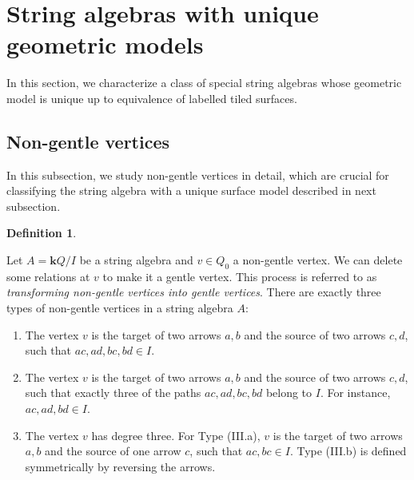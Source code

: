 \documentclass[11pt]{amsart}
\numberwithin{equation}{section}
\theoremstyle{definition}
\newtheorem{definition}[theorem]{Definition}
\begin{document}
\section{String algebras with unique geometric models}\label{section: string algebras with unique geometric models}

In this section, we characterize a class of special string algebras whose geometric model is unique up to equivalence of labelled tiled surfaces. 

\subsection{Non-gentle vertices} In this subsection, we study non-gentle vertices in detail, which are crucial for classifying the string algebra with a unique surface model described in next subsection. 

\begin{definition}\label{def:non-gentle vertices}
	
Let $A = \mathbf{k}Q/I$ be a string algebra and $v \in Q_0$ a non-gentle vertex. We can delete some relations at $v$ to make it a gentle vertex. This process is referred to as \emph{transforming non-gentle vertices into gentle vertices}. There are exactly three types of non-gentle vertices in a string algebra $A$:%
\begin{enumerate}[
    label=\textbf{Type (\Roman*)}, 
    ref=Type \Roman*, 
    leftmargin=2.2cm,        %
    labelwidth=2.0cm,        %
    align=left               %
]
    \item \label{type:I} The vertex $v$ is the target of two arrows $a, b$ and the source of two arrows $c, d$, such that $ac, ad, bc, bd \in I$. 
    
    \item \label{type:II} The vertex $v$ is the target of two arrows $a, b$ and the source of two arrows $c, d$, such that exactly three of the paths $ac, ad, bc, bd$ belong to $I$. For instance, $ac, ad, bd \in I$.
    
    \item \label{type:III} The vertex $v$ has degree three. For Type (III.a), $v$ is the target of two arrows $a, b$ and the source of one arrow $c$, such that $ac, bc \in I$. Type (III.b) is defined symmetrically by reversing the arrows.
\end{enumerate}
   

\end{definition}
\end{document}
